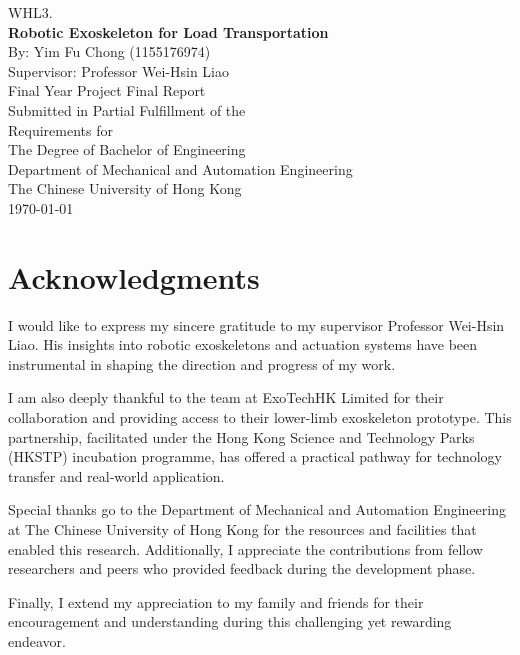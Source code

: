 \documentclass[12pt,a4paper]{report}
\begin{document}

\begin{titlepage}
  \centering
  \vspace*{1.5cm}
  {\large WHL3.}\\[1.2cm]
  {\LARGE \textbf{Robotic Exoskeleton for Load Transportation}}\\[1.5cm]
  By: Yim Fu Chong (1155176974)\\[0.8cm]
  Supervisor: Professor Wei-Hsin Liao\\[1.5cm]
  {\large Final Year Project Final Report}\\[0.6cm]
  Submitted in Partial Fulfillment of the\\
  Requirements for\\[0.5cm]
  The Degree of Bachelor of Engineering\\[0.8cm]
  Department of Mechanical and Automation Engineering\\
  The Chinese University of Hong Kong\\[1.5cm]
  {\large \today}
  \vfill
\end{titlepage}

\chapter*{Acknowledgments}
I would like to express my sincere gratitude to my supervisor Professor Wei-Hsin Liao. His insights into robotic exoskeletons and actuation systems have been instrumental in shaping the direction and progress of my work.

I am also deeply thankful to the team at ExoTechHK Limited for their collaboration and providing access to their lower-limb exoskeleton prototype. This partnership, facilitated under the Hong Kong Science and Technology Parks (HKSTP) incubation programme, has offered a practical pathway for technology transfer and real-world application.

Special thanks go to the Department of Mechanical and Automation Engineering at The Chinese University of Hong Kong for the resources and facilities that enabled this research. Additionally, I appreciate the contributions from fellow researchers and peers who provided feedback during the development phase.

Finally, I extend my appreciation to my family and friends for their encouragement and understanding during this challenging yet rewarding endeavor.
\end{document}
